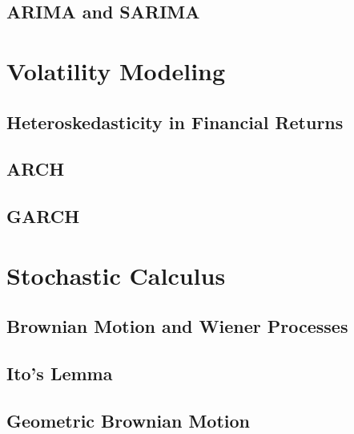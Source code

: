\subsection{ARIMA and SARIMA}


\section{Volatility Modeling}
\label{sec:volatility}

\subsection{Heteroskedasticity in Financial Returns}

\subsection{ARCH}

\subsection{GARCH}


\section{Stochastic Calculus}
\label{sec:stochastic-calculus}

\subsection{Brownian Motion and Wiener Processes}


\subsection{Ito's Lemma}

\subsection{Geometric Brownian Motion}

